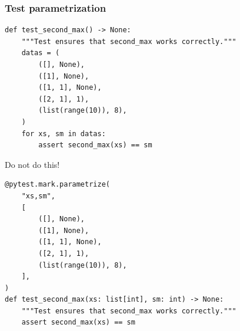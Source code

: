\documentclass[compress]{beamer}
\begin{document}
\begin{frame}[fragile]
\frametitle{Test parametrization\footnotemark[1]}

\begin{overprint}
\begin{center}
\begin{verbatim}
def test_second_max() -> None:
    """Test ensures that second_max works correctly."""
    datas = (
        ([], None),
        ([1], None),
        ([1, 1], None),
        ([2, 1], 1),
        (list(range(10)), 8),
    )
    for xs, sm in datas:
        assert second_max(xs) == sm
\end{verbatim}
\end{center}

\begin{center}
\Huge Do not do this!
\end{center}

\begin{center}
\begin{verbatim}
@pytest.mark.parametrize(
    "xs,sm",
    [
        ([], None),
        ([1], None),
        ([1, 1], None),
        ([2, 1], 1),
        (list(range(10)), 8),
    ],
)
def test_second_max(xs: list[int], sm: int) -> None:
    """Test ensures that second_max works correctly."""
    assert second_max(xs) == sm
\end{verbatim}
\end{center}
\end{overprint}

\end{frame}
\end{document}
